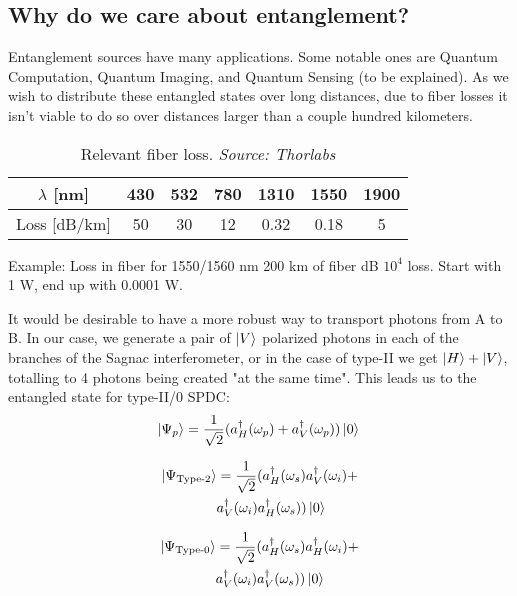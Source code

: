 \documentclass{article}
\theoremstyle{mytheoremstyle}
\theoremstyle{mytheoremstyle}
\theoremstyle{myproblemstyle}
\begin{document}
\subsection{Why do we care about entanglement?}
Entanglement sources have many applications. Some notable ones are Quantum Computation, Quantum Imaging,
and Quantum Sensing (to be explained). %
As we wish to distribute these entangled states over long distances, due to fiber losses it isn't viable to do so 
over distances larger than a couple hundred kilometers.
\begin{center}
	\begin{table}[h]
		\caption{Relevant fiber loss. \textit{Source: Thorlabs}}
		\label{tab:fiberloss}
		\begin{tabular}{|c|c|c|c|c|c|c|}
			\hline
			$\lambda$ [nm] & 430 & 532 & 780 & 1310 & 1550 & 1900\\
			\hline
			Loss [dB/km] & 50 & 30 & 12 & 0.32 &  0.18 & 5\\
			\hline
		\end{tabular}
	\end{table}
\end{center}
\begin{exampleblock}{Example: Loss in fiber for 1550/1560 nm}
	200 km of fiber  dB \rightarrow $10^4$ loss.
	Start with 1 W, end up with 0.0001 W.
\end{exampleblock}
It would be desirable to have a more robust way to transport photons from A to B.
In our case, we generate a pair of $\ket{V}$ polarized photons in each of the branches of the Sagnac interferometer,
or in the case of type-II we get $\ket{H} + \ket{V}$, totalling to 4 photons being created "at the same time".
This leads us to the entangled state for type-II/0 SPDC:
\begin{equation*}
	\ket{\Psi_{p}} = \frac{1}{\sqrt{2}} ( a_{H}^{\dagger} ( \omega_p ) + a_{V}^{\dagger} ( \omega_p ) )\ket{0}\\
\end{equation*}
\begin{minipage}[l]{0.48\textwidth}
	\begin{equation*}
		\begin{aligned}
			\ket{\Psi_{\text{Type-2}}} &= \frac{1}{\sqrt{2}}(a_{H}^{\dagger}(\omega_s)a_{V}^{\dagger}(\omega_i)+\\
								&a_{V}^{\dagger}(\omega_i)a_{H}^{\dagger}(\omega_s))\ket{0}\\
		\end{aligned}
	\end{equation*}
\end{minipage}
\begin{minipage}[r]{0.48\textwidth}
\begin{equation*}
	\begin{aligned}
		\ket{\Psi_{\text{Type-0}}} &= \frac{1}{\sqrt{2}}(a_{H}^{\dagger}(\omega_s)a_{H}^{\dagger}(\omega_i)+\\
								   &a_{V}^{\dagger}(\omega_i)a_{V}^{\dagger}(\omega_s))\ket{0}
	\end{aligned}
\end{equation*}
\end{minipage}
\end{document}
